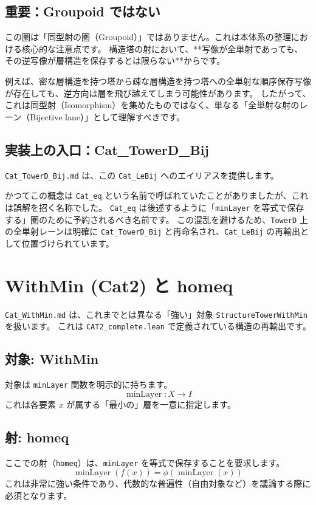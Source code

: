 \documentclass[judge=standard,11pt]{jlreq}
\theoremstyle{definition}
\newcommand{\minLayer}{\operatorname{minLayer}}
\begin{document}
\subsection{重要：Groupoid ではない}
この圏は「同型射の圏（Groupoid）」ではありません。これは本体系の整理における核心的な注意点です。
構造塔の射において、**写像が全単射であっても、その逆写像が層構造を保存するとは限らない**からです。

例えば、密な層構造を持つ塔から疎な層構造を持つ塔への全単射な順序保存写像が存在しても、逆方向は層を飛び越えてしまう可能性があります。
したがって、これは同型射（Isomorphism）を集めたものではなく、単なる「全単射な射のレーン（Bijective lane）」として理解すべきです。

\subsection{実装上の入口：Cat\_TowerD\_Bij}
\texttt{Cat\_TowerD\_Bij.md} は、この \texttt{Cat\_LeBij} へのエイリアスを提供します。

かつてこの概念は \texttt{Cat\_eq} という名前で呼ばれていたことがありましたが、これは誤解を招く名称でした。
\texttt{Cat\_eq} は後述するように「\texttt{minLayer} を等式で保存する」圏のために予約されるべき名前です。
この混乱を避けるため、\texttt{TowerD} 上の全単射レーンは明確に \texttt{Cat\_TowerD\_Bij} と再命名され、\texttt{Cat\_LeBij} の再輸出として位置づけられています。

\section{WithMin (Cat2) と homeq}

\texttt{Cat\_WithMin.md} は、これまでとは異なる「強い」対象 \texttt{StructureTowerWithMin} を扱います。
これは \texttt{CAT2\_complete.lean} で定義されている構造の再輸出です。

\subsection{対象: WithMin}
対象は \texttt{minLayer} 関数を明示的に持ちます。
\[ \minLayer: X \to I \]
これは各要素 $x$ が属する「最小の」層を一意に指定します。

\subsection{射: homeq}
ここでの射（\texttt{homeq}）は、\texttt{minLayer} を等式で保存することを要求します。
\[ \minLayer(f(x)) = \phi(\minLayer(x)) \]
これは非常に強い条件であり、代数的な普遍性（自由対象など）を議論する際に必須となります。
\end{document}
